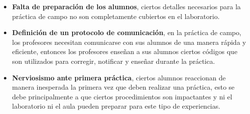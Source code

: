 \begin{itemize}
    \item \textbf{Falta de preparación de los alumnos}, ciertos detalles necesarios para
        la práctica de campo no son completamente cubiertos en el
        laboratorio.
    \item \textbf{Definición de un protocolo de comunicación}, en la práctica de campo,
        los profesores necesitan comunicarse con sus alumnos de una manera
        rápida y eficiente, entonces los profesores enseñan a sus alumnos
        ciertos códigos que son utilizados para corregir, notificar y enseñar
        durante la práctica.
    \item \textbf{Nerviosismo ante primera práctica}, ciertos alumnos reaccionan de
        manera inesperada la primera vez que deben realizar una práctica, esto
        se debe principalmente a que ciertos procedimientos son impactantes y
        ni el laboratorio ni el aula pueden preparar para este tipo de
        experiencias.
\end{itemize}

